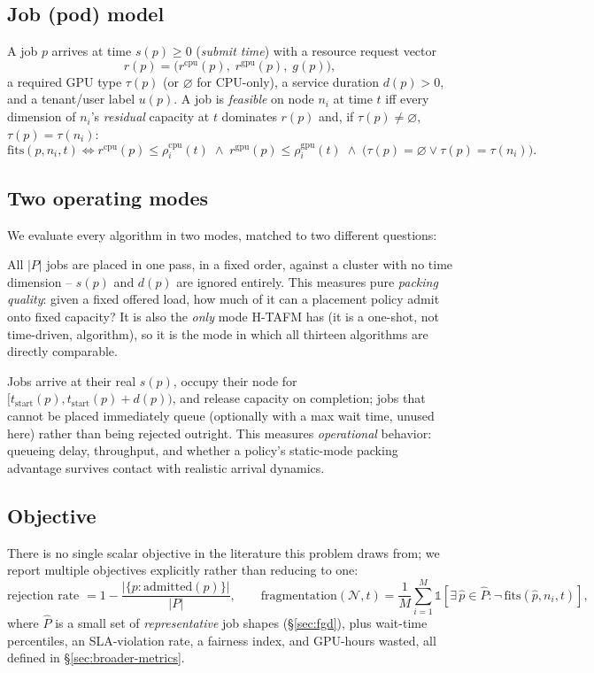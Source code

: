 \documentclass[11pt]{article}
\newcommand{\N}{\mathcal{N}}
\begin{document}
\subsection{Job (pod) model}
A job $p$ arrives at time $s(p) \geq 0$ (\emph{submit time}) with a resource
request vector
\[
  r(p) = \big(r^{\text{cpu}}(p),\; r^{\text{gpu}}(p),\; g(p)\big),
\]
a required GPU type $\tau(p)$ (or $\varnothing$ for CPU-only), a service
duration $d(p) > 0$, and a tenant/user label $u(p)$. A job is
\emph{feasible} on node $n_i$ at time $t$ iff every dimension of $n_i$'s
\emph{residual} capacity at $t$ dominates $r(p)$ and, if $\tau(p) \neq
\varnothing$, $\tau(p) = \tau(n_i)$:
\[
  \mathrm{fits}(p, n_i, t) \iff r^{\text{cpu}}(p) \leq \rho^{\text{cpu}}_i(t)
  \;\wedge\; r^{\text{gpu}}(p) \leq \rho^{\text{gpu}}_i(t)
  \;\wedge\; \big(\tau(p)=\varnothing \vee \tau(p)=\tau(n_i)\big).
\]

\subsection{Two operating modes}
We evaluate every algorithm in two modes, matched to two different
questions:

\begin{description}[leftmargin=1.2em]
\item[\textsc{static} (batch)] All $|P|$ jobs are placed in one pass, in a
  fixed order, against a cluster with no time dimension -- $s(p)$ and
  $d(p)$ are ignored entirely. This measures pure \emph{packing quality}: given
  a fixed offered load, how much of it can a placement policy admit onto
  fixed capacity? It is also the \emph{only} mode H-TAFM has (it is a
  one-shot, not time-driven, algorithm), so it is the mode in which all
  thirteen algorithms are directly comparable.
\item[\textsc{time-driven}] Jobs arrive at their real $s(p)$, occupy their
  node for $[t_{\text{start}}(p), t_{\text{start}}(p)+d(p))$, and release
  capacity on completion; jobs that cannot be placed immediately queue
  (optionally with a max wait time, unused here) rather than being rejected
  outright. This measures \emph{operational} behavior: queueing delay,
  throughput, and whether a policy's static-mode packing advantage
  survives contact with realistic arrival dynamics.
\end{description}

\subsection{Objective}
There is no single scalar objective in the literature this problem draws
from; we report multiple objectives explicitly rather than reducing to
one:
\[
  \text{rejection rate } = 1 - \frac{|\{p : \text{admitted}(p)\}|}{|P|},
  \qquad
  \text{fragmentation}(\N, t) = \frac{1}{M}\sum_{i=1}^M
  \mathbb{1}\!\left[\exists\, \hat p \in \hat P : \neg\,\mathrm{fits}(\hat p, n_i, t)\right],
\]
where $\hat P$ is a small set of \emph{representative} job shapes (\S\ref{sec:fgd}),
plus wait-time percentiles, an SLA-violation rate, a fairness index, and
GPU-hours wasted, all defined in \S\ref{sec:broader-metrics}.
\end{document}
